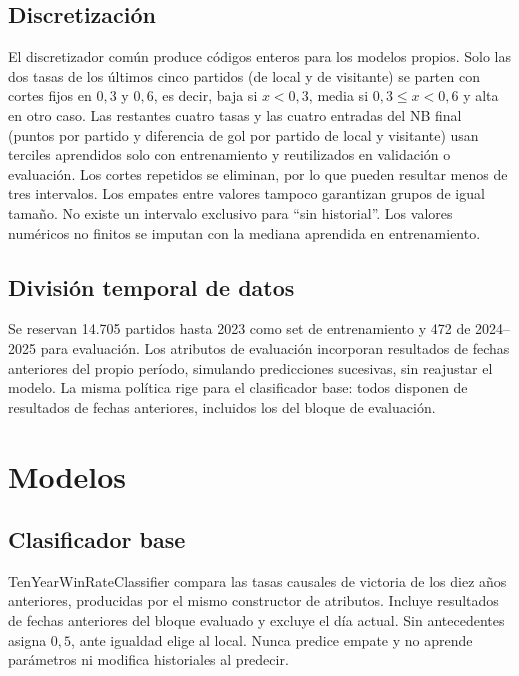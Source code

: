 \documentclass[conference]{IEEEtran}
\begin{document}
\subsection{Discretización}
El discretizador común produce códigos enteros para los modelos propios. Solo las dos tasas de los últimos cinco partidos (de local y de visitante) se parten con cortes fijos en $0{,}3$ y $0{,}6$, es decir, baja si $x<0{,}3$, media si $0{,}3\leq x<0{,}6$ y alta en otro caso. Las restantes cuatro tasas y las cuatro entradas del NB final (puntos por partido y diferencia de gol por partido de local y visitante) usan terciles aprendidos solo con entrenamiento y reutilizados en validación o evaluación. Los cortes repetidos se eliminan, por lo que pueden resultar menos de tres intervalos. Los empates entre valores tampoco garantizan grupos de igual tamaño. No existe un intervalo exclusivo para ``sin historial''. Los valores numéricos no finitos se imputan con la mediana aprendida en entrenamiento.

\subsection{División temporal de datos}
Se reservan 14.705 partidos hasta 2023 como set de entrenamiento y 472 de 2024--2025 para evaluación. Los atributos de evaluación incorporan resultados de fechas anteriores del propio período, simulando predicciones sucesivas, sin reajustar el modelo. La misma política rige para el clasificador base: todos disponen de resultados de fechas anteriores, incluidos los del bloque de evaluación.

\section{Modelos}
\label{sec:modelos}

\subsection{Clasificador base}
TenYearWinRateClassifier compara las tasas causales de victoria de los diez años anteriores, producidas por el mismo constructor de atributos. Incluye resultados de fechas anteriores del bloque evaluado y excluye el día actual. Sin antecedentes asigna $0{,}5$, ante igualdad elige al local. Nunca predice empate y no aprende parámetros ni modifica historiales al predecir.
\end{document}
